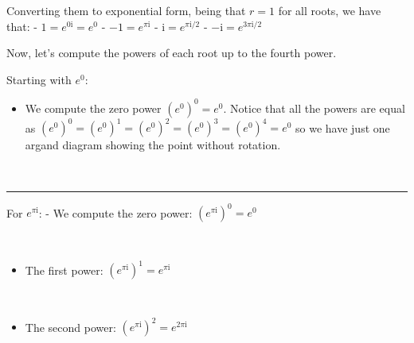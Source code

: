 \documentclass[11pt]{article}
\providecommand{\tightlist}{%
      \setlength{\itemsep}{0pt}\setlength{\parskip}{0pt}}
\begin{document}
Converting them to exponential form, being that \(r = 1\) for all roots,
we have that: - \(1 = e^{0\mathrm{i}} = e^0\) -
\(-1 = e^{\pi\mathrm{i}}\) - \(\mathrm{i} = e^{\pi\mathrm{i}/{2}}\) -
\(-\mathrm{i} = e^{3\pi\mathrm{i}/{2}}\)

Now, let's compute the powers of each root up to the fourth power.

Starting with \(e^0\):

\begin{itemize}
\tightlist
\item
  We compute the zero power \((e^0)^0 = e^0\). Notice that all the
  powers are equal as
  \((e^0)^0 = (e^0)^1 = (e^0)^2 = (e^0)^3 = (e^0)^4 = e^0\) so we have
  just one argand diagram showing the point without rotation.
\end{itemize}

    \begin{center}
    \end{center}
    { \hspace*{\fill} \\}
    
    \begin{center}\rule{0.5\linewidth}{0.5pt}\end{center}

    For \(e^{\pi\mathrm{i}}\): - We compute the zero power:
\((e^{\pi\mathrm{i}})^0 = e^0\)

    \begin{center}
    \end{center}
    { \hspace*{\fill} \\}
    
    \begin{itemize}
\tightlist
\item
  The first power: \((e^{\pi\mathrm{i}})^1 = e^{\pi\mathrm{i}}\)
\end{itemize}

    \begin{center}
    \end{center}
    { \hspace*{\fill} \\}
    
    \begin{itemize}
\tightlist
\item
  The second power: \((e^{\pi\mathrm{i}})^2 = e^{2\pi\mathrm{i}}\)
\end{itemize}
\end{document}
